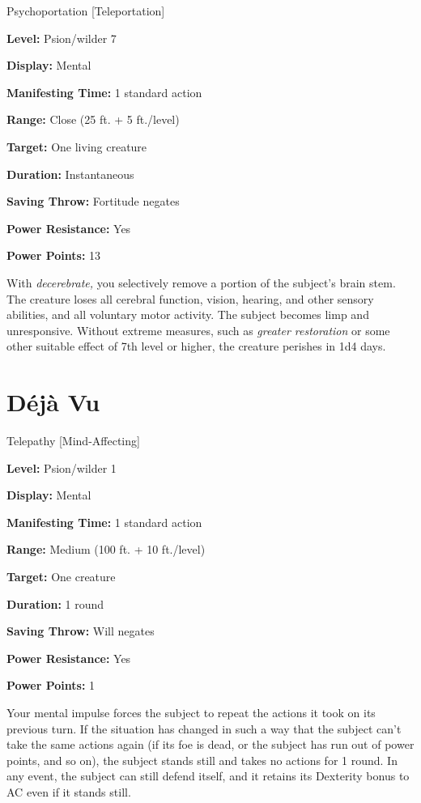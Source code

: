 \documentclass{article}
\begin{document}
Psychoportation [Teleportation]

\textbf{Level:} Psion/wilder 7

\textbf{Display:} Mental

\textbf{Manifesting Time:} 1 standard action

\textbf{Range:} Close (25 ft. + 5 ft./level)

\textbf{Target:} One living creature

\textbf{Duration:} Instantaneous

\textbf{Saving Throw:} Fortitude negates

\textbf{Power Resistance:} Yes

\textbf{Power Points:} 13

With \textit{decerebrate, }you selectively remove a portion of the subject's brain 
stem. The creature loses all cerebral function, vision, hearing, and other sensory 
abilities, and all voluntary motor activity. The subject becomes limp and unresponsive. 
Without extreme measures, such as \textit{greater restoration }or some other suitable 
effect of 7th level or higher, the creature perishes in 1d4 days.

\vspace{12pt}
\section*{Déjà Vu}

Telepathy [Mind-Affecting]

\textbf{Level:} Psion/wilder 1

\textbf{Display:} Mental

\textbf{Manifesting Time:} 1 standard action

\textbf{Range:} Medium (100 ft. + 10 ft./level)

\textbf{Target:} One creature

\textbf{Duration:} 1 round

\textbf{Saving Throw:} Will negates

\textbf{Power Resistance:} Yes

\textbf{Power Points:} 1

Your mental impulse forces the subject to repeat the actions it took on its previous 
turn. If the situation has changed in such a way that the subject can't take the 
same actions again (if its foe is dead, or the subject has run out of power points, 
and so on), the subject stands still and takes no actions for 1 round. In any event, 
the subject can still defend itself, and it retains its Dexterity bonus to AC even 
if it stands still.
\end{document}
